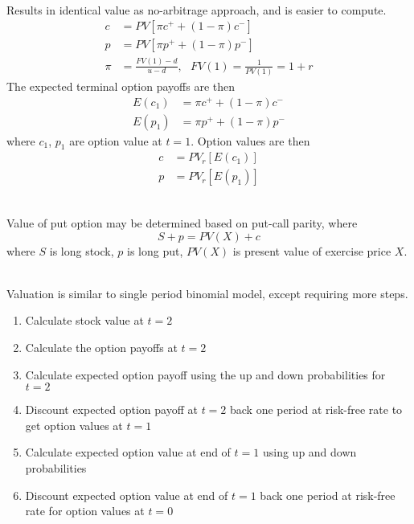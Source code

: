 \begin{method} \\
Results in identical value as no-arbitrage  approach, and is easier to compute.
\begin{align}
c &= PV[\pi c^+ + (1-\pi)c^-] \nonumber \\
p &= PV[\pi p^+ + (1-\pi)p^-] \nonumber \\
\pi &= \frac{FV(1)-d}{u-d}, \ \ \ FV(1) = \frac{1}{PV(1)} = 1+r \nonumber
\end{align}
The expected terminal option payoffs are then
\begin{align}
E(c_1) &= \pi c^+ + (1-\pi)c^- \nonumber \\
E(p_1) &= \pi p^+ + (1-\pi)p^- \nonumber
\end{align}
where $c_1$, $p_1$ are option value at $t=1$. Option values are then
\begin{align}
c &= PV_r[E(c_1)] \nonumber \\
p &= PV_r[E(p_1)] \nonumber
\end{align}
\end{method}

\begin{remark} \\
Value of put option may be determined based on put-call parity, where
\begin{equation}
S + p = PV(X) + c \nonumber 
\end{equation}
where $S$ is long stock, $p$ is long put, $PV(X)$ is present value of exercise price $X$.
\end{remark}

\begin{method} \\
Valuation is similar to single period binomial model, except requiring more steps.
\begin{enumerate}[label=\roman*.]
\setlength{\itemsep}{0pt}
\item Calculate stock value at $t=2$
\item Calculate the option payoffs at $t=2$
\item Calculate expected option payoff using the up and down probabilities for $t=2$
\item Discount expected option payoff at $t=2$ back one period at risk-free rate to get option values at $t=1$
\item Calculate expected option value at end of $t=1$ using up and down probabilities
\item Discount expected option value at end of $t=1$ back one period at risk-free rate for option values at $t=0$
\end{enumerate}
\end{method}

